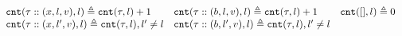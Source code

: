 \[
\begin{array}{lll}
\mathtt{cnt}(\mathtt{\tau} :: (x, l, v), l ) \triangleq \mathtt{cnt}(\mathtt{\tau}, l) + 1
&
\mathtt{cnt}(\mathtt{\tau}  ::(b, l, v), l) \triangleq \mathtt{cnt}(\mathtt{\tau}, l) + 1
&
\mathtt{cnt}({[]}, l) \triangleq 0
\\
\mathtt{cnt}(\mathtt{\tau}  :: (x, l', v), l) \triangleq \mathtt{cnt}(\mathtt{\tau}, l), l' \neq l
&
\mathtt{cnt}(\mathtt{\tau}  :: (b, l', v), l) \triangleq \mathtt{cnt}(\mathtt{\tau}, l), l' \neq l
\end{array}
\]
%
%
